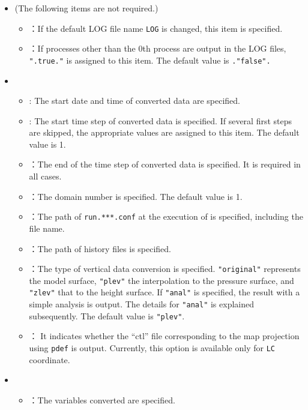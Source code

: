 \begin{itemize}
 \item {} (The following items are not required.)
 \begin{itemize}
  \item {}：If the default LOG file name \verb|LOG| is changed, this item is specified.
  \item {}：If processes other than the 0th process are output in the LOG files,
\verb|".true."| is assigned to this item.  The default value is \verb|."false".|
 \end{itemize}
 \item {}
 \begin{itemize}
  \item {} : The start date and time of converted \netcdf data are specified.
  \item {} : The start time step of converted \netcdf data is specified.
    If several first steps are skipped, the appropriate values are assigned to this item.
    The default value is 1.
  \item {}：The end of the time step of converted \netcdf data is specified.
    It is required in all cases.
  \item {}：The domain number is specified. The default value is 1.
  \item {}：The path of \verb|run.***.conf| at the execution of \scalerm is specified, including the file name.
  \item {}：The path of history files is specified.
  \item {}：The type of vertical data conversion is specified. \verb|"original"| represents the model surface,
    \verb|"plev"| the interpolation to the pressure surface,
    and \verb|"zlev"| that to the height surface.
    If \verb|"anal"| is specified, the result with a simple analysis is output. The details for \verb|"anal"| is explained subsequently.
    The default value is \verb|"plev"|.
  \item {}： It indicates whether the ``ctl'' file corresponding to the map projection using \verb|pdef| is output. Currently, this option is available only for \verb|LC| coordinate.
 \end{itemize}
 \item {}
 \begin{itemize}
  \item {}：The variables converted are specified.

\end{itemize}
\end{itemize}
